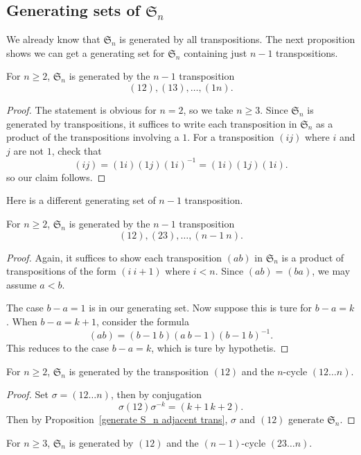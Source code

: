 \subsection{Generating sets of $\mathfrak{S}_n$}
We already know that $\mathfrak{S}_n$ is generated by all transpositions. The next proposition shows we can get a generating set for $\mathfrak{S}_n$ containing just $n-1$ transpositions.
\begin{proposition}\label{generate S_n trans with 1}
For $n\geq2$, $\mathfrak{S}_n$ is generated by the $n-1$ transposition
\[(12),(13),\dots,(1n).\]
\end{proposition}
\begin{proof}
The statement is obvious for $n=2$, so we take $n\geq3$. Since $\mathfrak{S}_n$ is generated by transpositions, it suffices to write each transposition in $\mathfrak{S}_n$ as a product of the transpositions involving a $1$. For a transposition $(ij)$ where $i$ and $j$ are not $1$, check that
\[(ij)=(1i)(1j)(1i)^{-1}=(1i)(1j)(1i).\]
so our claim follows.
\end{proof}
Here is a different generating set of $n-1$ transposition.
\begin{proposition}\label{generate S_n adjacent trans}
For $n\geq2$, $\mathfrak{S}_n$ is generated by the $n-1$ transposition
\[(12),(23),\dots,(n-1\ n).\]
\end{proposition}
\begin{proof}
Again, it suffices to show each transposition $(ab)$ in $\mathfrak{S}_n$ is a product of transpositions of the form $(i\ i+1)$ where $i<n$. Since $(ab)=(ba)$, we may assume $a<b$.\par
The case $b-a=1$ is in our generating set. Now suppose this is ture for $b-a=k$. When $b-a=k+1$, consider the formula
\[(ab)=(b-1\ b)(a\ b-1)(b-1\ b)^{-1}.\]
This reduces to the case $b-a=k$, which is ture by hypothetis.
\end{proof}
\begin{proposition}\label{generate S_n (12) (12 n)}
For $n\geq2$, $\mathfrak{S}_n$ is generated by the transposition $(12)$ and the $n$-cycle $(12\dots n)$.
\end{proposition}
\begin{proof}
Set $\sigma=(12\dots n)$, then by conjugation
\[\sigma(12)\sigma^{-k}=(k+1\,k+2).\]
Then by Proposition~\ref{generate S_n adjacent trans}, $\sigma$ and $(12)$ generate $\mathfrak{S}_n$.
\end{proof}
\begin{corollary}
For $n\geq3$, $\mathfrak{S}_n$ is generated by $(12)$ and the $(n-1)$-cycle $(23\dots n)$.
\end{corollary}
